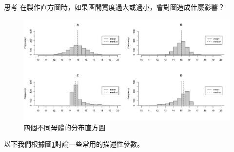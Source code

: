    \bigskip
    
    \begin{custom}{思考}
        在製作直方圖時，如果區間寬度過大或過小，會對圖造成什麼影響？
    \end{custom}

    \bigskip

    \begin{figure}[htbp]
      \centering
      \includegraphics[width=\textwidth]{figures/02-Descriptive_statistics/descriptive_cont.png}
      \caption{四個不同母體的分布直方圖}
      \label{fig:descriptive_cont}
    \end{figure}

    \bigskip
        
    以下我們根據圖\ref{fig:descriptive_cont}討論一些常用的描述性參數。

